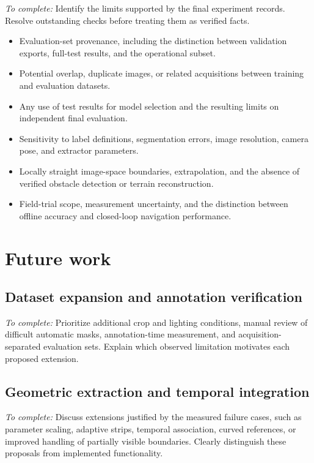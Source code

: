 \emph{To complete:} Identify the limits supported by the final experiment
records. Resolve outstanding checks before treating them as verified facts.
\begin{itemize}
    \item Evaluation-set provenance, including the distinction between
    validation exports, full-test results, and the operational subset.
    \item Potential overlap, duplicate images, or related acquisitions
    between training and evaluation datasets.
    \item Any use of test results for model selection and the resulting
    limits on independent final evaluation.
    \item Sensitivity to label definitions, segmentation errors, image
    resolution, camera pose, and extractor parameters.
    \item Locally straight image-space boundaries, extrapolation, and
    the absence of verified obstacle detection or terrain reconstruction.
    \item Field-trial scope, measurement uncertainty, and the distinction
    between offline accuracy and closed-loop navigation performance.
\end{itemize}

\section{Future work}
\label{sec:c6_future_work}

\subsection{Dataset expansion and annotation verification}
\label{subsec:c6_future_data}

\emph{To complete:} Prioritize additional crop and lighting conditions,
manual review of difficult automatic masks, annotation-time measurement,
and acquisition-separated evaluation sets. Explain which observed
limitation motivates each proposed extension.

\subsection{Geometric extraction and temporal integration}
\label{subsec:c6_future_geometry}

\emph{To complete:} Discuss extensions justified by the measured failure
cases, such as parameter scaling, adaptive strips, temporal association,
curved references, or improved handling of partially visible boundaries.
Clearly distinguish these proposals from implemented functionality.

